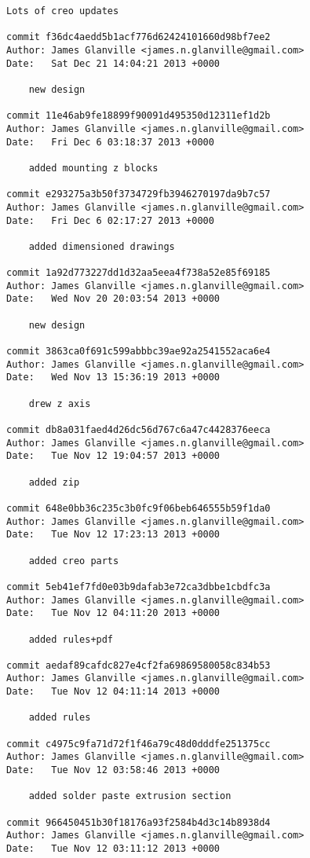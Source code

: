 \documentclass[a4paper,11pt]{article}  %
\begin{document}
\begin{lstlisting}[frame=single]
    Lots of creo updates

commit f36dc4aedd5b1acf776d62424101660d98bf7ee2
Author: James Glanville <james.n.glanville@gmail.com>
Date:   Sat Dec 21 14:04:21 2013 +0000

    new design

commit 11e46ab9fe18899f90091d495350d12311ef1d2b
Author: James Glanville <james.n.glanville@gmail.com>
Date:   Fri Dec 6 03:18:37 2013 +0000

    added mounting z blocks

commit e293275a3b50f3734729fb3946270197da9b7c57
Author: James Glanville <james.n.glanville@gmail.com>
Date:   Fri Dec 6 02:17:27 2013 +0000

    added dimensioned drawings

commit 1a92d773227dd1d32aa5eea4f738a52e85f69185
Author: James Glanville <james.n.glanville@gmail.com>
Date:   Wed Nov 20 20:03:54 2013 +0000

    new design

commit 3863ca0f691c599abbbc39ae92a2541552aca6e4
Author: James Glanville <james.n.glanville@gmail.com>
Date:   Wed Nov 13 15:36:19 2013 +0000

    drew z axis

commit db8a031faed4d26dc56d767c6a47c4428376eeca
Author: James Glanville <james.n.glanville@gmail.com>
Date:   Tue Nov 12 19:04:57 2013 +0000

    added zip

commit 648e0bb36c235c3b0fc9f06beb646555b59f1da0
Author: James Glanville <james.n.glanville@gmail.com>
Date:   Tue Nov 12 17:23:13 2013 +0000

    added creo parts

commit 5eb41ef7fd0e03b9dafab3e72ca3dbbe1cbdfc3a
Author: James Glanville <james.n.glanville@gmail.com>
Date:   Tue Nov 12 04:11:20 2013 +0000

    added rules+pdf

commit aedaf89cafdc827e4cf2fa69869580058c834b53
Author: James Glanville <james.n.glanville@gmail.com>
Date:   Tue Nov 12 04:11:14 2013 +0000

    added rules

commit c4975c9fa71d72f1f46a79c48d0dddfe251375cc
Author: James Glanville <james.n.glanville@gmail.com>
Date:   Tue Nov 12 03:58:46 2013 +0000

    added solder paste extrusion section

commit 966450451b30f18176a93f2584b4d3c14b8938d4
Author: James Glanville <james.n.glanville@gmail.com>
Date:   Tue Nov 12 03:11:12 2013 +0000


\end{lstlisting}
\end{document}

